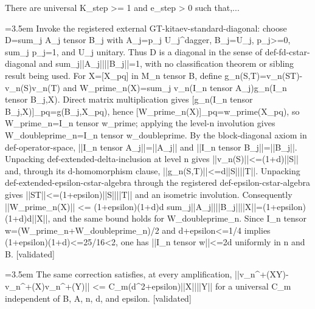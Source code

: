 \documentclass{article}
\newcommand{\step}[1]{\par\noindent\hangindent=3.5em\hangafter=1%
  \makebox[3.5em][l]{\textbf{#1.}}}
\newcommand{\steptag}[1]{\hfill{\small\textsf{[#1]}}}
\begin{document}
\begin{proofbox}{There are universal K\_step >= 1 and e\_step > 0 such that,...}
\step{1.2.2} Invoke the registered external GT-kitaev-standard-diagonal: choose D=sum\_j A\_j tensor B\_j with A\_j=p\_j U\_j\textasciicircum{}dagger, B\_j=U\_j, p\_j>=0, sum\_j p\_j=1, and U\_j unitary. Thus D is a diagonal in the sense of def-fd-cstar-diagonal and sum\_j||A\_j||||B\_j||=1, with no classification theorem or sibling result being used. For X=[X\_pq] in M\_n tensor B, define g\_n(S,T)=v\_n(ST)-v\_n(S)v\_n(T) and W\_prime\_n(X)=sum\_j v\_n(I\_n tensor A\_j)g\_n(I\_n tensor B\_j,X). Direct matrix multiplication gives [g\_n(I\_n tensor B\_j,X)]\_pq=g(B\_j,X\_pq), hence [W\_prime\_n(X)]\_pq=w\_prime(X\_pq), so W\_prime\_n=I\_n tensor w\_prime; applying the level-n involution gives W\_doubleprime\_n=I\_n tensor w\_doubleprime. By the block-diagonal axiom in def-operator-space, ||I\_n tensor A\_j||=||A\_j|| and ||I\_n tensor B\_j||=||B\_j||. Unpacking def-extended-delta-inclusion at level n gives ||v\_n(S)||<=(1+d)||S|| and, through its d-homomorphism clause, ||g\_n(S,T)||<=d||S||||T||. Unpacking def-extended-epsilon-cstar-algebra through the registered def-epsilon-cstar-algebra gives ||ST||<=(1+epsilon)||S||||T|| and an isometric involution. Consequently ||W\_prime\_n(X)|| <= (1+epsilon)(1+d)d sum\_j||A\_j||||B\_j||||X||=(1+epsilon)(1+d)d||X||, and the same bound holds for W\_doubleprime\_n. Since I\_n tensor w=(W\_prime\_n+W\_doubleprime\_n)/2 and d+epsilon<=1/4 implies (1+epsilon)(1+d)<=25/16<2, one has ||I\_n tensor w||<=2d uniformly in n and B. \steptag{validated} \\[4pt]
\step{1.3} The same correction satisfies, at every amplification, ||v\_n\textasciicircum{}+(XY)-v\_n\textasciicircum{}+(X)v\_n\textasciicircum{}+(Y)|| <= C\_m(d\textasciicircum{}2+epsilon)||X||||Y|| for a universal C\_m independent of B, A, n, d, and epsilon. \steptag{validated} \\[6pt]

\end{proofbox}
\end{document}
